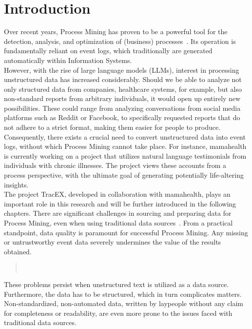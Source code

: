 \section{Introduction}
Over recent years, Process Mining has proven to be a powerful tool for the detection, analysis, and optimization of (business) processes~\cite{weske_business_2012}. Its operation is fundamentally reliant on event logs, which traditionally are generated automatically within Information Systems.\\
However, with the rise of large language models (LLMs), interest in processing unstructured data has increased considerably. Should we be able to analyze not only structured data from companies, healthcare systems, for example, but also non-standard reports from arbitrary individuals, it would open up entirely new possibilities. These could range from analyzing conversations from social media platforms such as Reddit or Facebook, to specifically requested reports that do not adhere to a strict format, making them easier for people to produce.\\
Consequently, there exists a crucial need to convert unstructured data into event logs, without which Process Mining cannot take place. For instance, mamahealth is currently working on a project that utilizes natural language testimonials from individuals with chronic illnesses. The project views these accounts from a process perspective, with the ultimate goal of generating potentially life-altering insights.\\
The project TracEX, developed in collaboration with mamahealth, plays an important role in this research and will be further introduced in the following chapters. There are significant challenges in sourcing and preparing data for Process Mining, even when using traditional data sources~\cite{van_der_aalst_process_2016}. From a practical standpoint, data quality is paramount for successful Process Mining. Any missing or untrustworthy event data severely undermines the value of the results obtained. 
\begin{quote}
    ~\cite{van_der_aalst_process_2016}    
\end{quote}
These problems persist when unstructured text is utilized as a data source. Furthermore, the data has to be structured, which in turn complicates matters. Non-standardized, non-automated data, written by laypeople without any claim for completeness or readability, are even more prone to the issues faced with traditional data sources.\\
